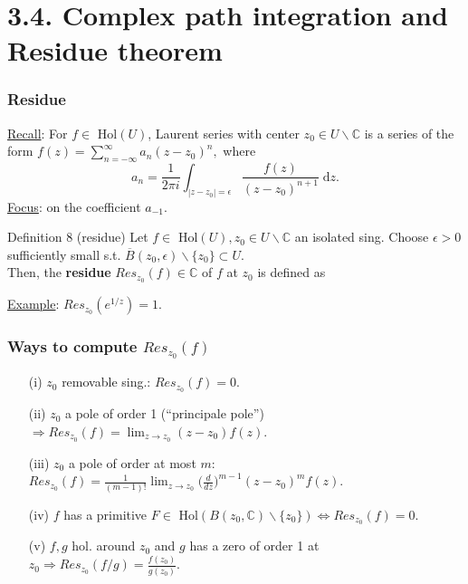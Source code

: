 \documentclass[10pt]{beamer}
\newcommand{\C}{\mathbb{C}}
\begin{document}
{\section{3.4.  Complex path integration and Residue theorem}

\begin{frame} \frametitle{Residue}
\underline{Recall}: For $f\in$ Hol$(U)$,  Laurent series with center $z_0\in U\backslash \C$ is a series of the form
$f(z)=\sum_{n=-\infty}^\infty a_n(z-z_0)^n,$
where $$a_n=\frac{1}{2\pi i} \int_{|z-z_0|=\epsilon} \frac{f(z)}{(z-z_0)^{n+1}} \; \text{d}z.$$
\underline{Focus}: on the coefficient $a_{-1}$.
\begin{alertblock}{Definition 8 (residue)}
Let $f\in$ Hol$(U), z_0\in U\backslash \C$ an isolated sing. Choose $\epsilon>0$ sufficiently small s.t. $\overline{B}(z_0,\epsilon)\backslash \{z_0\} \subset U$. \\
Then, the \textbf{residue} $Res_{z_0}(f)\in \C$ of $f$ at $z_0$ is defined as\\
\vspace{1.5cm}
\end{alertblock}
\underline{Example}: $Res_{z_0}(e^{1/z})=1.$
\end{frame}

\begin{frame} \frametitle{Ways to compute $Res_{z_0}(f)$}
\begin{itemize}
\item[(i)] $z_0$ removable sing.: $Res_{z_0}(f)=0$.\\
\vspace{0.2cm}
\item[(ii)] $z_0$ a pole of order 1 (``principale pole'') $\Rightarrow  Res_{z_0}(f)=\lim_{z \rightarrow z_0}(z-z_0)f(z).$\\
\vspace{0.2cm}
\vspace{0.2cm}
\item[(iii)] $z_0$ a pole of order at most $m$: $Res_{z_0}(f)=\frac{1}{(m-1)!}\lim_{z \rightarrow z_0}\big(\frac{d}{dz}\big)^{m-1}(z-z_0)^m f(z)$.\\
\vspace{0.2cm}
\item[(iv)] $f$ has a primitive $F\in$ Hol$(B(z_0,\C)\backslash\{z_0\}) \iff Res_{z_0}(f)=0$.\\
\vspace{0.2cm}
\item[(v)] $f,g$ hol. around $z_0$ and $g$ has a zero of order 1 at $z_0 \Rightarrow  Res_{z_0}(f/g)=\frac{f(z_0)}{g(z_0)}.$


\end{itemize}
\end{frame}}
\end{document}
